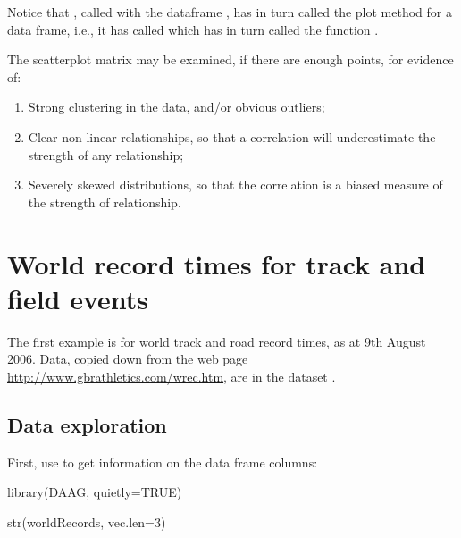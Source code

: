 Notice that , called with the dataframe ,
has in turn called the plot method for a data frame, i.e.,
it has called  which has in turn called
the function .

The scatterplot matrix may be examined, if there are enough
points, for evidence of:
\begin{enumerate}
\item Strong clustering in the data, and/or
obvious outliers;
\item Clear non-linear relationships, so that a
correlation will underestimate the strength of any relationship;
\item Severely skewed distributions, so that the correlation is a biased
measure of the strength of relationship.
\end{enumerate}

\section{World record times for track and field events}\label{sec:wr}

The first example is for world track and road record times,
 as at 9th August 2006.  Data,
copied down from the web page
\url{http://www.gbrathletics.com/wrec.htm}, are in the dataset
.

\subsection*{Data exploration}
First, use  to get information on the data frame columns:

\begin{Schunk}
\begin{Sinput}
library(DAAG, quietly=TRUE)
\end{Sinput}
\end{Schunk}

\begin{Schunk}
\begin{Sinput}
str(worldRecords, vec.len=3)
\end{Sinput}
\end{Schunk}

